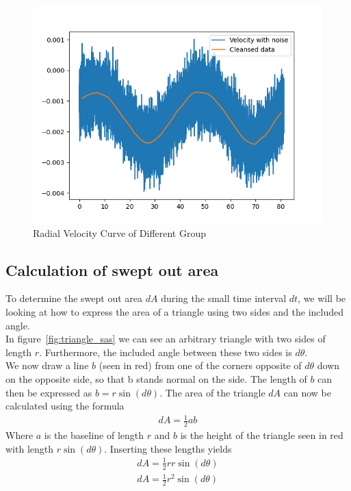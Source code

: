\documentclass[reprint,english,notitlepage]{revtex4-2}
\begin{document}
			\begin{figure}[h!]
			  \centering
			  \includegraphics[scale = .25]{Figures/Other_Group_Radial_Velocity}
			  \caption{Radial Velocity Curve of Different Group}
			  \label{fig: Radial Velocity}
			\end{figure}

\subsection{Calculation of swept out area}\label{subsec:calculation-of-swept-out-area}
    To determine the swept out area $dA$ during the small time interval $dt$, we will be looking at how to express the area of a triangle using two sides and the included angle.\\
	In figure~\ref{fig:triangle_sas} we can see an arbitrary triangle with two sides of length $r$.
	Furthermore, the included angle between these two sides is $d\theta$.\\

	We now draw a line $b$ (seen in red) from one of the corners opposite of $d\theta$ down on the opposite side, so that b stands normal on the side.
	The length of $b$ can then be expressed as $b = r \sin\left(d\theta\right)$.
	The area of the triangle $dA$ can now be calculated using the formula
	\begin{align*}
		dA = \frac{1}{2} a b
	\end{align*}
	Where $a$ is the baseline of length $r$ and $b$ is the height of the triangle seen in red with length $r \sin\left(d\theta\right)$.
	Inserting these lengths yields
	\begin{align*}
	    dA = \frac{1}{2} r r \sin\left(d\theta\right)\\
		dA = \frac{1}{2} r^2 \sin\left(d\theta\right)
	\end{align*}
\end{document}
